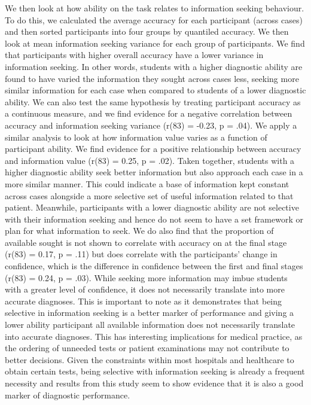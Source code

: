 \documentclass[a4paper, nobind]{templates/ociamthesis}
\begin{document}
We then look at how ability on the task relates to information seeking behaviour. To do this, we calculated the average accuracy for each participant (across cases) and then sorted participants into four groups by quantiled accuracy. We then look at mean information seeking variance for each group of participants. We find that participants with higher overall accuracy have a lower variance in information seeking. In other words, students with a higher diagnostic ability are found to have varied the information they sought across cases less, seeking more similar information for each case when compared to students of a lower diagnostic ability. We can also test the same hypothesis by treating participant accuracy as a continuous measure, and we find evidence for a negative correlation between accuracy and information seeking variance (r(83) = -0.23, p = .04). We apply a similar analysis to look at how information value varies as a function of participant ability. We find evidence for a positive relationship between accuracy and information value (r(83) = 0.25, p = .02). Taken together, students with a higher diagnostic ability seek better information but also approach each case in a more similar manner. This could indicate a base of information kept constant across cases alongside a more selective set of useful information related to that patient. Meanwhile, participants with a lower diagnostic ability are not selective with their information seeking and hence do not seem to have a set framework or plan for what information to seek. We do also find that the proportion of available sought is not shown to correlate with accuracy on at the final stage (r(83) = 0.17, p = .11) but does correlate with the participants' change in confidence, which is the difference in confidence between the first and final stages (r(83) = 0.24, p = .03). While seeking more information may imbue students with a greater level of confidence, it does not necessarily translate into more accurate diagnoses. This is important to note as it demonstrates that being selective in information seeking is a better marker of performance and giving a lower ability participant all available information does not necessarily translate into accurate diagnoses. This has interesting implications for medical practice, as the ordering of unneeded tests or patient examinations may not contribute to better decisions. Given the constraints within most hospitals and healthcare to obtain certain tests, being selective with information seeking is already a frequent necessity and results from this study seem to show evidence that it is also a good marker of diagnostic performance.
\end{document}
